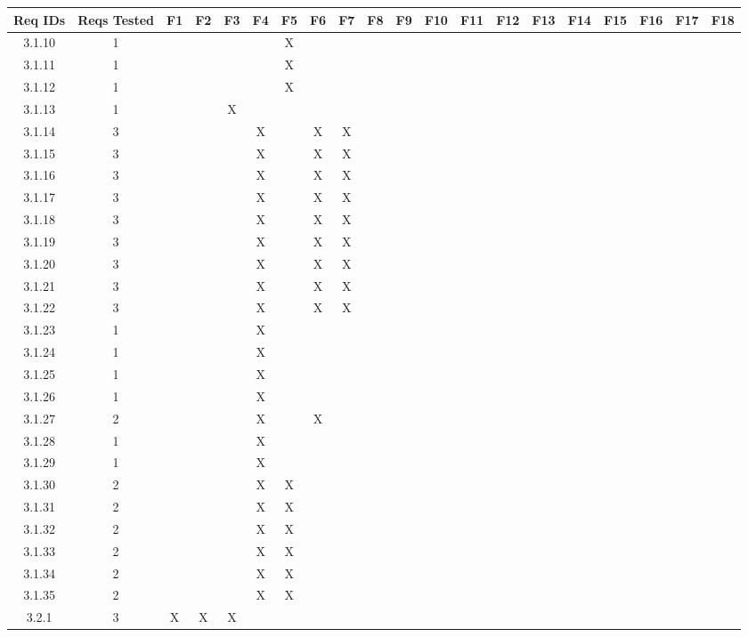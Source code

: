 \documentclass[titlepage]{article}
\begin{document}
\begin{center}
\begin{table}[h!]
\hspace*{-7.5mm}
\begin{tabular}{|c|c|c|c|c |c|c|c|c|c |c|c|c|c|c |c|c|c|c|c|}\hline
\multicolumn{1}{|C{1.5}|}{Req IDs}	&\multicolumn{1}{|C{1}|}{Reqs Tested}	&F1	&F2	&F3	&F4	&F5	&F6	&F7	&F8	&F9	&F10	&F11	&F12	&F13	&F14	&F15	&F16	&F17	&F18\\\hline
3.1.10 &1&&& &&X&&& &&&&& &&&&&\\\hline
3.1.11 &1&&& &&X&&& &&&&& &&&&&\\\hline
3.1.12 &1&&& &&X&&& &&&&& &&&&&\\\hline
3.1.13 &1&&&X &&&&& &&&&& &&&&&\\\hline
3.1.14 &3&&& &X&&X&X& &&&&& &&&&&\\\hline
3.1.15 &3&&& &X&&X&X& &&&&& &&&&&\\\hline
3.1.16 &3&&& &X&&X&X& &&&&& &&&&&\\\hline
3.1.17 &3&&& &X&&X&X& &&&&& &&&&&\\\hline
3.1.18 &3&&& &X&&X&X& &&&&& &&&&&\\\hline
3.1.19 &3&&& &X&&X&X& &&&&& &&&&&\\\hline
3.1.20 &3&&& &X&&X&X& &&&&& &&&&&\\\hline
3.1.21 &3&&& &X&&X&X& &&&&& &&&&&\\\hline
3.1.22 &3&&& &X&&X&X& &&&&& &&&&&\\\hline
3.1.23 &1&&& &X&&&& &&&&& &&&&&\\\hline
3.1.24 &1&&& &X&&&& &&&&& &&&&&\\\hline
3.1.25 &1&&& &X&&&& &&&&& &&&&&\\\hline
3.1.26 &1&&& &X&&&& &&&&& &&&&&\\\hline
3.1.27 &2&&& &X&&X&& &&&&& &&&&&\\\hline
3.1.28 &1&&& &X&&&& &&&&& &&&&&\\\hline
3.1.29 &1&&& &X&&&& &&&&& &&&&&\\\hline
3.1.30 &2&&& &X&X&&& &&&&& &&&&&\\\hline
3.1.31 &2&&& &X&X&&& &&&&& &&&&&\\\hline
3.1.32 &2&&& &X&X&&& &&&&& &&&&&\\\hline
3.1.33 &2&&& &X&X&&& &&&&& &&&&&\\\hline
3.1.34 &2&&& &X&X&&& &&&&& &&&&&\\\hline
3.1.35 &2&&& &X&X&&& &&&&& &&&&&\\\hline
3.2.1 &3&X&X&X &&&&& &&&&& &&&&&\\\hline

\end{tabular}
\end{table}
\end{center}
\end{document}
